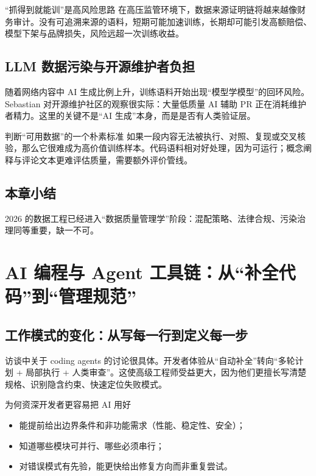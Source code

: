 \documentclass[a4paper]{article}
\begin{document}
\begin{warningbox}{“抓得到就能训”是高风险思路}
在高压监管环境下，数据来源证明链将越来越像财务审计。没有可追溯来源的语料，短期可能加速训练，长期却可能引发高额赔偿、模型下架与品牌损失，风险远超一次训练收益。
\end{warningbox}

\subsection{LLM 数据污染与开源维护者负担}

随着网络内容中 AI 生成比例上升，训练语料开始出现“模型学模型”的回环风险。Sebastian 对开源维护社区的观察很实际：大量低质量 AI 辅助 PR 正在消耗维护者精力。这里的关键不是“AI 生成”本身，而是是否有人类验证层。

\begin{knowledgebox}{判断“可用数据”的一个朴素标准}
如果一段内容无法被执行、对照、复现或交叉核验，那么它很难成为高价值训练样本。代码语料相对好处理，因为可运行；概念阐释与评论文本更难评估质量，需要额外评价管线。
\end{knowledgebox}

\subsection{本章小结}

2026 的数据工程已经进入“数据质量管理学”阶段：混配策略、法律合规、污染治理同等重要，缺一不可。

\section{AI 编程与 Agent 工具链：从“补全代码”到“管理规范”}

\subsection{工作模式的变化：从写每一行到定义每一步}

访谈中关于 coding agents 的讨论很具体。开发者体验从“自动补全”转向“多轮计划 + 局部执行 + 人类审查”。这使高级工程师受益更大，因为他们更擅长写清楚规格、识别隐含约束、快速定位失败模式。

\begin{importantbox}{为何资深开发者更容易把 AI 用好}
\begin{itemize}[leftmargin=1.5em]
    \item 能提前给出边界条件和非功能需求（性能、稳定性、安全）；
    \item 知道哪些模块可并行、哪些必须串行；
    \item 对错误模式有先验，能更快给出修复方向而非重复尝试。
\end{itemize}
\end{importantbox}
\end{document}
